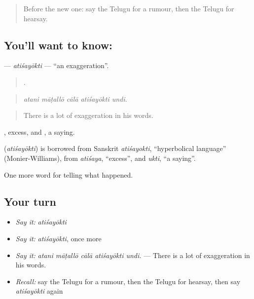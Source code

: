 \begin{quote}
Before the new one: say the Telugu for a rumour, then the Telugu for hearsay.
\end{quote}

\subsection*{You'll want to know: }
\textbf{} — \emph{atiśayōkti} — \textquotedblleft{}an exaggeration\textquotedblright{}.

\begin{quote}
    .
\end{quote}

\begin{quote}
\emph{atani māṭallō cālā atiśayōkti undi.}
\end{quote}

\begin{quote}
There is a lot of exaggeration in his words.
\end{quote}

, excess, and , a saying.

\begin{cousinweb}
\textbf{} (\emph{atiśayōkti}) is borrowed from Sanskrit \emph{atiśayokti}, \textquotedblleft{}hyperbolical language\textquotedblright{} (Monier-Williams), from \emph{atiśaya}, \textquotedblleft{}excess\textquotedblright{}, and \emph{ukti}, \textquotedblleft{}a saying\textquotedblright{}.
\end{cousinweb}

\begin{grammarlens}[title={What you've built}]
One more word for telling what happened.
\end{grammarlens}

\subsection*{Your turn}
\begin{itemize}
\raggedright
  \item \emph{Say it:} \emph{atiśayōkti}
  \item \emph{Say it:} \emph{atiśayōkti}, once more
  \item \emph{Say it:} \emph{atani māṭallō cālā atiśayōkti undi.} — There is a lot of exaggeration in his words.
  \item \emph{Recall:} say the Telugu for a rumour, then the Telugu for hearsay, then say \emph{atiśayōkti} again
\end{itemize}

